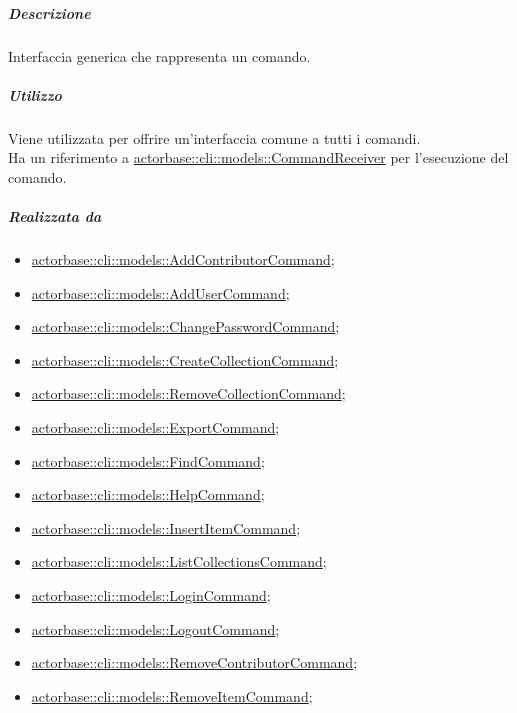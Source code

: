 \documentclass{scalatekids-article}
\begin{document}
\subparagraph{Descrizione}

Interfaccia generica che rappresenta un comando.

\subparagraph{Utilizzo}

Viene utilizzata per offrire un'interfaccia comune a tutti i comandi.\\Ha un
riferimento a \hyperref[sec:actorbase::cli::models::CommandReceiver]{actorbase::cli::models::CommandReceiver} per l'esecuzione del
comando.

\subparagraph{Realizzata da}

\begin{itemize}
\item \hyperref[sec:actorbase::cli::models::AddContributorCommand]{actorbase::cli::models::AddContributorCommand};
\item \hyperref[sec:actorbase::cli::models::AddUserCommand]{actorbase::cli::models::AddUserCommand};
\item \hyperref[sec:actorbase::cli::models::ChangePasswordCommand]{actorbase::cli::models::ChangePasswordCommand};
\item \hyperref[sec:actorbase::cli::models::CreateCollectionCommand]{actorbase::cli::models::CreateCollectionCommand};
\item \hyperref[sec:actorbase::cli::models::RemoveCollectionCommand]{actorbase::cli::models::RemoveCollectionCommand};
\item \hyperref[sec:actorbase::cli::models::ExportCommand]{actorbase::cli::models::ExportCommand};
\item \hyperref[sec:actorbase::cli::models::FindCommand]{actorbase::cli::models::FindCommand};
\item \hyperref[sec:actorbase::cli::models::HelpCommand]{actorbase::cli::models::HelpCommand};
\item \hyperref[sec:actorbase::cli::models::InsertItemCommand]{actorbase::cli::models::InsertItemCommand};
\item \hyperref[sec:actorbase::cli::models::ListCollectionsCommand]{actorbase::cli::models::ListCollectionsCommand};
\item \hyperref[sec:actorbase::cli::models::LoginCommand]{actorbase::cli::models::LoginCommand};
\item \hyperref[sec:actorbase::cli::models::LogoutCommand]{actorbase::cli::models::LogoutCommand};
\item \hyperref[sec:actorbase::cli::models::RemoveContributorCommand]{actorbase::cli::models::RemoveContributorCommand};
\item \hyperref[sec:actorbase::cli::models::RemoveItemCommand]{actorbase::cli::models::RemoveItemCommand};

\end{itemize}
\end{document}
